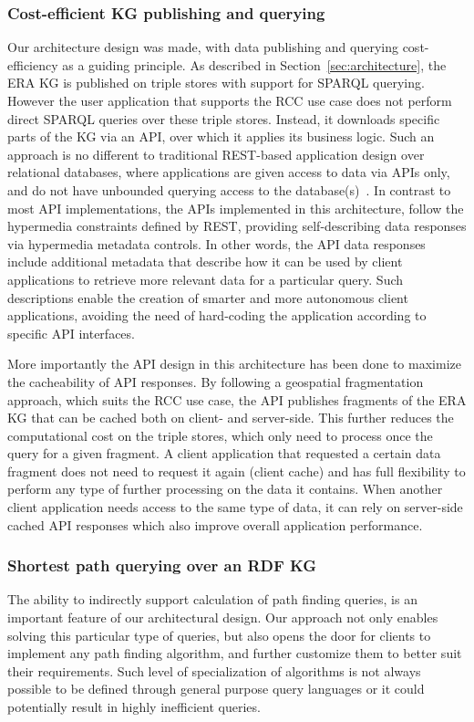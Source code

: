 \subsubsection{Cost-efficient KG publishing and querying}
Our architecture design was made,
with data publishing and querying cost-efficiency as a guiding principle.
As described in Section~\ref{sec:architecture},
the ERA KG is published on triple stores with support for SPARQL querying.
However the user application that supports the RCC use case
does not perform direct SPARQL queries over these triple stores.
Instead, it downloads specific parts of the KG via an API,
over which it applies its business logic.
Such an approach is no different
to traditional REST-based application design over relational databases,
where applications are given access to data via APIs only,
and do not have unbounded querying access to the database(s)~\cite{chaudhuri2000, fielding2002}.
In contrast to most API implementations, the APIs implemented in this architecture,
follow the hypermedia constraints defined by REST,
providing self-describing data responses via hypermedia metadata controls.
In other words, the API data responses include additional metadata
that describe how it can be used by client applications
to retrieve more relevant data for a particular query.
Such descriptions enable the creation of smarter
and more autonomous client applications,
avoiding the need of hard-coding
the application according to specific API interfaces.

More importantly the API design in this architecture
has been done to maximize the cacheability of API responses.
By following a geospatial fragmentation approach,
which suits the RCC use case,
the API publishes fragments of the ERA KG
that can be cached both on client- and server-side.
This further reduces the computational cost on the triple stores,
which only need to process once the query for a given fragment.
A client application that requested a certain data fragment
does not need to request it again (client cache)
and has full flexibility to perform any type of further processing on the data it contains.
When another client application needs access to the same type of data,
it can rely on server-side cached API responses
which also improve overall application performance.

\subsubsection{Shortest path querying over an RDF KG}
The ability to indirectly support calculation of path finding queries,
is an important feature of our architectural design.
Our approach not only enables solving this particular type of queries,
but also opens the door for clients
to implement any path finding algorithm, %
and further customize them to better suit their requirements.
Such level of specialization of algorithms
is not always possible to be defined through general purpose query languages
or it could potentially result in highly inefficient queries.

